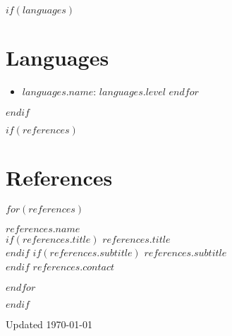 \documentclass[10.5pt,a4paper]{article}
\newenvironment{entryDetails}
  {%
    \begin{itemize}[leftmargin=2.5em, rightmargin=2.5em, itemsep=1pt, topsep=1pt, parsep=0pt]
  }
  {%
    \end{itemize}
    \vspace{-0.1cm}
  }
\begin{document}
$if(languages)$
\section*{Languages}
\begin{entryDetails}
	$for(languages)$
	\item \textbf{$languages.name$}: $languages.level$
	$endfor$
\end{entryDetails}
$endif$

$if(references)$
\section*{References}
\begin{multicols}{3}
	\raggedcolumns
	$for(references)$
	\noindent
	\begin{minipage}[t]{\linewidth}
		\textbf{$references.name$}\\
		$if(references.title)$%
		\textit{$references.title$}\\
		$endif$%
		$if(references.subtitle)$%
		\textit{$references.subtitle$}\\
		$endif$%
		\href{mailto:$references.contact$}{$references.contact$}%
	\end{minipage}\par
	\vspace{8pt}
	$endfor$
\end{multicols}
$endif$

\vfill
\begin{center}
	\footnotesize{Updated \today}
\end{center}
\end{document}
